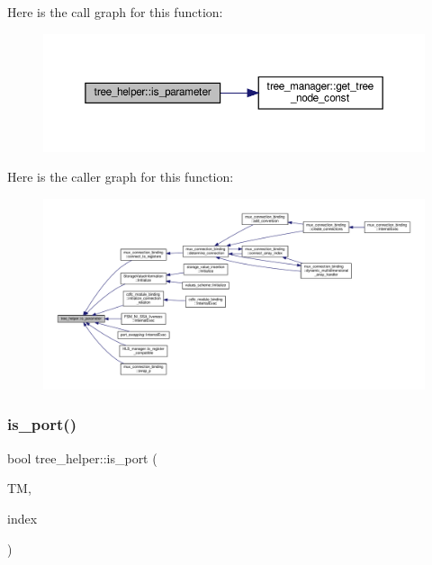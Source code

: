 Here is the call graph for this function\+:
\nopagebreak
\begin{figure}[H]
\begin{center}
\leavevmode
\includegraphics[width=350pt]{d7/d99/classtree__helper_a710ad60447604c98f49d4d49359071a1_cgraph}
\end{center}
\end{figure}
Here is the caller graph for this function\+:
\nopagebreak
\begin{figure}[H]
\begin{center}
\leavevmode
\includegraphics[width=350pt]{d7/d99/classtree__helper_a710ad60447604c98f49d4d49359071a1_icgraph}
\end{center}
\end{figure}
\mbox{\label{classtree__helper_ab05d299651f0c54fa25b26b8446c26d5}} 
\subsubsection{\texorpdfstring{is\+\_\+port()}{is\_port()}}
{\footnotesize\ttfamily bool tree\+\_\+helper\+::is\+\_\+port (\begin{DoxyParamCaption}\item[{const \hyperlink{tree__manager_8hpp_a792e3f1f892d7d997a8d8a4a12e39346}{tree\+\_\+manager\+Const\+Ref} \&}]{TM,  }\item[{const unsigned int}]{index }\end{DoxyParamCaption})\hspace{0.3cm}{\ttfamily [static]}}



